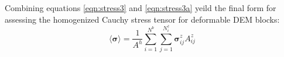Combining equations \ref{eqn:stress3} and \ref{eqn:stress3a} yeild the final form for assessing the homogenized Cauchy stress tensor for deformable DEM blocks:
\begin{equation}
\label{eqn:stress4}
\langle \boldsymbol{\sigma} \rangle = 
\frac{1}{A^h} \sum_{i=1}^{N^{b}} \sum_{j=1}^{N^{z}_i} \boldsymbol{\sigma}^z_{ij} A^{z}_{ij} 
\end{equation}



